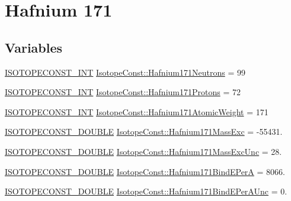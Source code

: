 \hypertarget{group___isotope_const-_hafnium-_hf171}{}\section{Hafnium 171}
\label{group___isotope_const-_hafnium-_hf171}
\subsection*{Variables}
\begin{DoxyCompactItemize}
\item 
\mbox{\hyperlink{group___isotope_const-_macros_ga5f18360b3e99483a35c32d789e62621c}{I\+S\+O\+T\+O\+P\+E\+C\+O\+N\+S\+T\+\_\+\+I\+NT}} \mbox{\hyperlink{group___isotope_const-_hafnium-_hf171_ga86afa37580e6890993d80f4768ebb418}{Isotope\+Const\+::\+Hafnium171\+Neutrons}} = 99
\item 
\mbox{\hyperlink{group___isotope_const-_macros_ga5f18360b3e99483a35c32d789e62621c}{I\+S\+O\+T\+O\+P\+E\+C\+O\+N\+S\+T\+\_\+\+I\+NT}} \mbox{\hyperlink{group___isotope_const-_hafnium-_hf171_gad5edca836bfadc575a838ddf786cc9c5}{Isotope\+Const\+::\+Hafnium171\+Protons}} = 72
\item 
\mbox{\hyperlink{group___isotope_const-_macros_ga5f18360b3e99483a35c32d789e62621c}{I\+S\+O\+T\+O\+P\+E\+C\+O\+N\+S\+T\+\_\+\+I\+NT}} \mbox{\hyperlink{group___isotope_const-_hafnium-_hf171_ga7091dd31ee7f01ddaa41bd1d8e7c6b96}{Isotope\+Const\+::\+Hafnium171\+Atomic\+Weight}} = 171
\item 
\mbox{\hyperlink{group___isotope_const-_macros_ga8f45a7272ce02c0b4c65c44636ed719a}{I\+S\+O\+T\+O\+P\+E\+C\+O\+N\+S\+T\+\_\+\+D\+O\+U\+B\+LE}} \mbox{\hyperlink{group___isotope_const-_hafnium-_hf171_ga5f35943e6816cd87eac44a0c134f7cbc}{Isotope\+Const\+::\+Hafnium171\+Mass\+Exc}} = -\/55431.
\item 
\mbox{\hyperlink{group___isotope_const-_macros_ga8f45a7272ce02c0b4c65c44636ed719a}{I\+S\+O\+T\+O\+P\+E\+C\+O\+N\+S\+T\+\_\+\+D\+O\+U\+B\+LE}} \mbox{\hyperlink{group___isotope_const-_hafnium-_hf171_ga3ed70235209a20e40ed355a9120d72f7}{Isotope\+Const\+::\+Hafnium171\+Mass\+Exc\+Unc}} = 28.
\item 
\mbox{\hyperlink{group___isotope_const-_macros_ga8f45a7272ce02c0b4c65c44636ed719a}{I\+S\+O\+T\+O\+P\+E\+C\+O\+N\+S\+T\+\_\+\+D\+O\+U\+B\+LE}} \mbox{\hyperlink{group___isotope_const-_hafnium-_hf171_gab82f5c9732c8b5e2cf70a489c7625055}{Isotope\+Const\+::\+Hafnium171\+Bind\+E\+PerA}} = 8066.
\item 
\mbox{\hyperlink{group___isotope_const-_macros_ga8f45a7272ce02c0b4c65c44636ed719a}{I\+S\+O\+T\+O\+P\+E\+C\+O\+N\+S\+T\+\_\+\+D\+O\+U\+B\+LE}} \mbox{\hyperlink{group___isotope_const-_hafnium-_hf171_ga77b8c0ce67a52bcd6bc061fb881cc157}{Isotope\+Const\+::\+Hafnium171\+Bind\+E\+Per\+A\+Unc}} = 0.

\end{DoxyCompactItemize}
